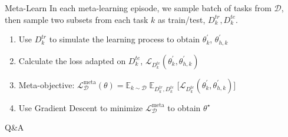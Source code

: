 \documentclass{beamer}
\begin{document}
\begin{frame}[t]{Meta-Learn}
  In each meta-learning episode, we sample batch of tasks from $\mathcal{D}$, \\
  then sample two subsets from each task $k$ as train/test, $D^{tr}_k, D^{te}_k$.

  \begin{enumerate}
    \item Use $D^{tr}_k$ to simulate the learning process to obtain $\theta^\prime_k$, $\theta^\prime_{h,k}$
    \item Calculate the loss adapted on $D^{te}_k$, $\mathcal{L}_{D^{te}_k}(\theta^\prime_k, \theta^\prime_{h,k})$
    \item Meta-objective: $\mathcal{L}^{\text{meta}}_{\mathcal{D}}(\theta) =  \mathbb{E}_{k \sim \mathcal{D}} \; \mathbb{E}_{D_k^{tr}, D_k^{te}}$ $\Big [ \mathcal{L}_{D^{te}_k}(\theta^\prime_k, \theta^\prime_{h,k}) \Big ]$
    \item Use Gradient Descent to minimize $\mathcal{L}^{\text{meta}}_{\mathcal{D}}$ to obtain $\theta^\star$

  \end{enumerate}
\end{frame}






\begin{frame}
	\begin{center}
    \LARGE{Q\&A}
	\end{center}
\end{frame}



\end{document}
